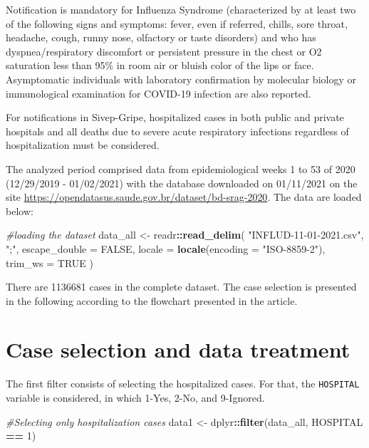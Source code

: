 \documentclass[
]{article}
\newenvironment{Shaded}{\begin{snugshade}}{\end{snugshade}}
\newcommand{\CommentTok}[1]{\textcolor[rgb]{0.56,0.35,0.01}{\textit{#1}}}
\newcommand{\DataTypeTok}[1]{\textcolor[rgb]{0.13,0.29,0.53}{#1}}
\newcommand{\DecValTok}[1]{\textcolor[rgb]{0.00,0.00,0.81}{#1}}
\newcommand{\KeywordTok}[1]{\textcolor[rgb]{0.13,0.29,0.53}{\textbf{#1}}}
\newcommand{\NormalTok}[1]{#1}
\newcommand{\OperatorTok}[1]{\textcolor[rgb]{0.81,0.36,0.00}{\textbf{#1}}}
\newcommand{\OtherTok}[1]{\textcolor[rgb]{0.56,0.35,0.01}{#1}}
\newcommand{\StringTok}[1]{\textcolor[rgb]{0.31,0.60,0.02}{#1}}
\begin{document}
Notification is mandatory for Influenza Syndrome (characterized by at
least two of the following signs and symptoms: fever, even if referred,
chills, sore throat, headache, cough, runny nose, olfactory or taste
disorders) and who has dyspnea/respiratory discomfort or persistent
pressure in the chest or O2 saturation less than 95\% in room air or
bluish color of the lips or face. Asymptomatic individuals with
laboratory confirmation by molecular biology or immunological
examination for COVID-19 infection are also reported.

For notifications in Sivep-Gripe, hospitalized cases in both public and
private hospitals and all deaths due to severe acute respiratory
infections regardless of hospitalization must be considered.

The analyzed period comprised data from epidemiological weeks 1 to 53 of
2020 (12/29/2019 - 01/02/2021) with the database downloaded on
01/11/2021 on the site
\url{https://opendatasus.saude.gov.br/dataset/bd-srag-2020}. The data
are loaded below:

\begin{Shaded}
\begin{Highlighting}[]
\CommentTok{#loading the dataset}
\NormalTok{data_all <-}\StringTok{ }\NormalTok{readr}\OperatorTok{::}\KeywordTok{read_delim}\NormalTok{(}
  \StringTok{"INFLUD-11-01-2021.csv"}\NormalTok{,}
  \StringTok{";"}\NormalTok{,}
  \DataTypeTok{escape_double =} \OtherTok{FALSE}\NormalTok{,}
  \DataTypeTok{locale =} \KeywordTok{locale}\NormalTok{(}\DataTypeTok{encoding =} \StringTok{"ISO-8859-2"}\NormalTok{),}
  \DataTypeTok{trim_ws =} \OtherTok{TRUE}
\NormalTok{)}
\end{Highlighting}
\end{Shaded}

There are 1136681 cases in the complete dataset. The case selection is
presented in the following according to the flowchart presented in the
article.

\hypertarget{case-selection-and-data-treatment}{%
\section{Case selection and data
treatment}\label{case-selection-and-data-treatment}}

The first filter consists of selecting the hospitalized cases. For that,
the \texttt{HOSPITAL} variable is considered, in which 1-Yes, 2-No, and
9-Ignored.

\begin{Shaded}
\begin{Highlighting}[]
\CommentTok{#Selecting only hospitalization cases}
\NormalTok{data1 <-}\StringTok{ }\NormalTok{dplyr}\OperatorTok{::}\KeywordTok{filter}\NormalTok{(data_all, HOSPITAL }\OperatorTok{==}\StringTok{ }\DecValTok{1}\NormalTok{)}
\end{Highlighting}
\end{Shaded}
\end{document}
